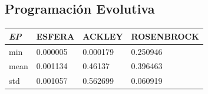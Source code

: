 \documentclass{article}
\begin{document}
\newpage
\subsection{Programación Evolutiva}
\begin{table}[H]
  \centering
  \begin{tabular}{|l|l|l|l|}
    \hline
    \textit{\textbf{EP}} & ESFERA   & ACKLEY   & ROSENBROCK \\ \hline
    min                  & 0.000005 & 0.000179 & 0.250946   \\ \hline
    mean                 & 0.001134 & 0.46137  & 0.396463   \\ \hline
    std                  & 0.001057 & 0.562699 & 0.060919   \\ \hline
  \end{tabular}
\end{table}
\end{document}

